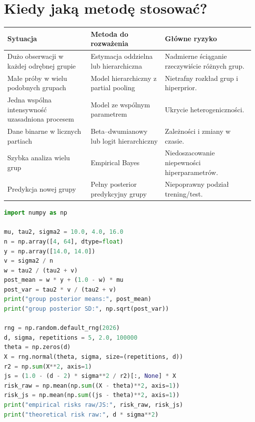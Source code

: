 \section{Kiedy jaką metodę stosować?}
\begin{center}\small
\begin{tabular}{>{\raggedright\arraybackslash}p{}>{\raggedright\arraybackslash}p{}>{\raggedright\arraybackslash}p{}}
\toprule
\textbf{Sytuacja} & \textbf{Metoda do rozważenia} & \textbf{Główne ryzyko}\\
\midrule
Dużo obserwacji w każdej odrębnej grupie & Estymacja oddzielna lub hierarchiczna & Nadmierne ściąganie rzeczywiście różnych grup.\\
Małe próby w wielu podobnych grupach & Model hierarchiczny z partial pooling & Nietrafny rozkład grup i hiperprior.\\
Jedna wspólna intensywność uzasadniona procesem & Model ze wspólnym parametrem & Ukrycie heterogeniczności.\\
Dane binarne w licznych partiach & Beta--dwumianowy lub logit hierarchiczny & Zależności i zmiany w czasie.\\
Szybka analiza wielu grup & Empirical Bayes & Niedoszacowanie niepewności hiperparametrów.\\
Predykcja nowej grupy & Pełny posterior predykcyjny grupy & Niepoprawny podział trening/test.\\
\bottomrule
\end{tabular}
\end{center}

\begin{lstlisting}[language=Python,caption={Kompletny program: partial pooling dla średnich grup i ryzyko Jamesa--Steina (Python, NumPy).}]
import numpy as np

mu, tau2, sigma2 = 10.0, 4.0, 16.0
n = np.array([4, 64], dtype=float)
y = np.array([14.0, 14.0])
v = sigma2 / n
w = tau2 / (tau2 + v)
post_mean = w * y + (1.0 - w) * mu
post_var = tau2 * v / (tau2 + v)
print("group posterior means:", post_mean)
print("group posterior SD:", np.sqrt(post_var))

rng = np.random.default_rng(2026)
d, sigma, repetitions = 5, 2.0, 100000
theta = np.zeros(d)
X = rng.normal(theta, sigma, size=(repetitions, d))
r2 = np.sum(X**2, axis=1)
js = (1.0 - (d - 2) * sigma**2 / r2)[:, None] * X
risk_raw = np.mean(np.sum((X - theta)**2, axis=1))
risk_js = np.mean(np.sum((js - theta)**2, axis=1))
print("empirical risks raw/JS:", risk_raw, risk_js)
print("theoretical risk raw:", d * sigma**2)
\end{lstlisting}

